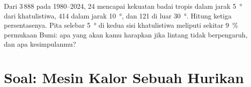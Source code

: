 \begin{exercise}[$\star\star\star$]\label{exo:g10:storms-and-cyclones:15}
Dari 3\,888  pada 1980--2024, 24 mencapai kekuatan badai tropis
dalam jarak \qty{5}{\degree} dari khatulistiwa, 414 dalam jarak
\qty{10}{\degree}, dan 121 di luar \qty{30}{\degree}. Hitung ketiga
persentasenya. Pita selebar \qty{5}{\degree} di kedua sisi khatulistiwa
meliputi sekitar \qty{9}{\percent} permukaan Bumi: apa yang akan kamu harapkan
jika lintang tidak berpengaruh, dan apa kesimpulanmu?
\end{exercise}

\section{Soal: Mesin Kalor Sebuah Hurikan}

